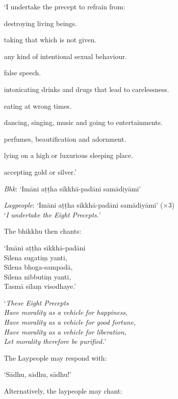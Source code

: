 
{\itshape

‘I undertake the precept to refrain from:

\begin{packeditemize}

\item destroying living beings.
\item taking that which is not given.
\item any kind of intentional sexual behaviour.
\item false speech.
\item intoxicating drinks and drugs that lead to carelessness.
\item eating at wrong times.
\item dancing, singing, music and going to entertainments.
\item perfumes, beautification and adornment.
\item lying on a high or luxurious sleeping place.
\item accepting gold or silver.’

\end{packeditemize}

}

\emph{Bhk}: ‘Imāni aṭṭha sikkhā-padāni samādiyāmi’

\emph{Laypeople}: ‘Imāni aṭṭha sikkhā-padāni samādiyāmi’ (×3)\\
‘\emph{I undertake the Eight Precepts.}’

The bhikkhu then chants:

‘Imāni aṭṭha sikkhā-padāni\\
Sīlena sugatiṃ yanti,\\
Sīlena bhoga-sampadā,\\
Sīlena nibbutiṃ yanti,\\
Tasmā sīlaṃ visodhaye.’

‘\emph{These Eight Precepts\\
Have morality as a vehicle for happiness,\\
Have morality as a vehicle for good fortune,\\
Have morality as a vehicle for liberation,\\
Let morality therefore be purified.}’

The Laypeople may respond with:

‘Sādhu, sādhu, sādhu!’

Alternatively, the laypeople may chant:

